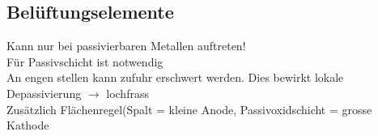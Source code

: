 \subsection{Belüftungselemente}
Kann nur bei passivierbaren Metallen auftreten!\\
Für Passivschicht ist  notwendig\\
An engen stellen kann  zufuhr erschwert werden. Dies bewirkt lokale Depassivierung $\rightarrow$ lochfrass\\
Zusätzlich Flächenregel(Spalt = kleine Anode, Passivoxidschicht = grosse Kathode
